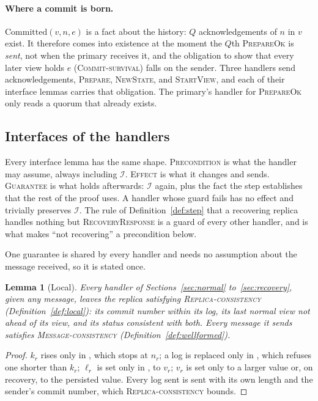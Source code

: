 \documentclass[11pt,a4paper]{article}
\theoremstyle{plain}
\newtheorem{lemma}[theorem]{Lemma}
\theoremstyle{definition}
\theoremstyle{remark}
\newcommand{\msg}[1]{\textsc{#1}}
\newcommand{\Inv}{\mathcal{I}}
\newcommand{\Committed}{\mathrm{Committed}}
\newcommand{\Local}{\textsc{Replica-consistency}}
\newcommand{\WellFormed}{\textsc{Message-consistency}}
\newcommand{\Survival}{\textsc{Commit-survival}}
\begin{document}
\paragraph{Where a commit is born.} $\Committed(v, n, e)$ is a fact
about the history: $Q$ acknowledgements of $n$ in $v$ exist. It
therefore comes into existence at the moment the $Q$th
\msg{PrepareOk} is \emph{sent}, not when the primary receives it, and
the obligation to show that every later view holds $e$
(\Survival) falls on the sender. Three handlers send acknowledgements,
\msg{Prepare}, \msg{NewState}, and \msg{StartView}, and each of their
interface lemmas carries that obligation. The primary's handler for
\msg{PrepareOk} only reads a quorum that already exists.

\subsection{Interfaces of the handlers}

Every interface lemma has the same shape. \textsc{Precondition} is what
the handler may assume, always including $\Inv$. \textsc{Effect} is what
it changes and sends. \textsc{Guarantee} is what holds afterwards:
$\Inv$ again, plus the fact the step establishes that the rest of the
proof uses. A handler whose guard fails has no effect and trivially
preserves $\Inv$. The rule of Definition~\ref{def:step} that a recovering
replica handles nothing but \msg{RecoveryResponse} is a guard of every
other handler, and is what makes ``not recovering'' a precondition
below.

One guarantee is shared by every handler and needs no assumption about
the message received, so it is stated once.

\begin{lemma}[Local]
\label{lem:local}
Every handler of Sections~\ref{sec:normal} to~\ref{sec:recovery}, given
any message, leaves the replica satisfying \Local{}
(Definition~\ref{def:local}): its commit number within its log, its
last normal view not ahead of its view, and its status consistent with
both. Every message it sends satisfies \WellFormed{}
(Definition~\ref{def:wellformed}).
\end{lemma}
\begin{proof}
$k_r$ rises only in , which stops at $n_r$; a log is
replaced only in , which refuses one shorter than
$k_r$; $\ell_r$ is set only in , to $v_r$; $v_r$ is
set only to a larger value or, on recovery, to the persisted value.
Every log sent is sent with its own length and the sender's commit
number, which \Local{} bounds.
\end{proof}
\end{document}
